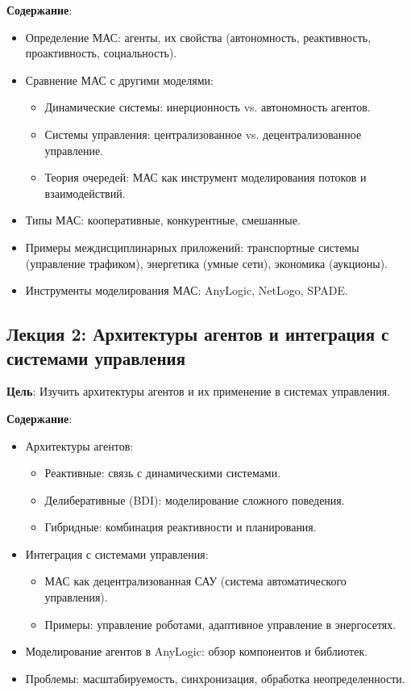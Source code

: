 \textbf{Содержание}:
\begin{itemize}
    \item Определение МАС: агенты, их свойства (автономность, реактивность, проактивность, социальность).
    \item Сравнение МАС с другими моделями:
    \begin{itemize}
        \item Динамические системы: инерционность vs. автономность агентов.
        \item Системы управления: централизованное vs. децентрализованное управление.
        \item Теория очередей: МАС как инструмент моделирования потоков и взаимодействий.
    \end{itemize}
    \item Типы МАС: кооперативные, конкурентные, смешанные.
    \item Примеры междисциплинарных приложений: транспортные системы (управление трафиком), энергетика (умные сети), экономика (аукционы).
    \item Инструменты моделирования МАС: AnyLogic, NetLogo, SPADE.
\end{itemize}

\subsection*{Лекция 2: Архитектуры агентов и интеграция с системами управления}
\textbf{Цель}: Изучить архитектуры агентов и их применение в системах управления.

\textbf{Содержание}:
\begin{itemize}
    \item Архитектуры агентов:
    \begin{itemize}
        \item Реактивные: связь с динамическими системами.
        \item Делиберативные (BDI): моделирование сложного поведения.
        \item Гибридные: комбинация реактивности и планирования.
    \end{itemize}
    \item Интеграция с системами управления:
    \begin{itemize}
        \item МАС как децентрализованная САУ (система автоматического управления).
        \item Примеры: управление роботами, адаптивное управление в энергосетях.
    \end{itemize}
    \item Моделирование агентов в AnyLogic: обзор компонентов и библиотек.
    \item Проблемы: масштабируемость, синхронизация, обработка неопределенности.
\end{itemize}

